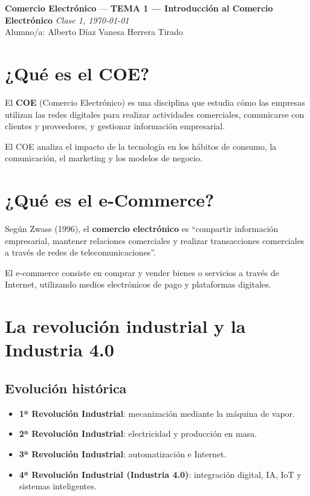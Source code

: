 \documentclass[11pt,a4paper]{article}
\newcommand{\asignatura}{Comercio Electrónico}
\newcommand{\tema}{TEMA 1 — Introducción al Comercio Electrónico}
\newcommand{\clase}{Clase 1}
\newcommand{\fecha}{\today}
\begin{document}
{\large \textbf{\asignatura} \;—\; \textbf{\tema} \hfill \textit{\clase, \fecha}}\\[0.4em]
\faUser\; Alumno/a: Alberto Díaz\hfill
\faChalkboardTeacher\; Vanesa Herrera Tirado\hfill

\vspace{0.6em}
\tableofcontents

\section{¿Qué es el COE?}
\begin{DefBox}
El \textbf{COE} (Comercio Electrónico) es una disciplina que estudia cómo las empresas utilizan las redes digitales para realizar actividades comerciales, comunicarse con clientes y proveedores, y gestionar información empresarial.
\end{DefBox}

\begin{NotaBox}
El COE analiza el impacto de la tecnología en los hábitos de consumo, la comunicación, el marketing y los modelos de negocio.
\end{NotaBox}

\section{¿Qué es el e-Commerce?}
\begin{DefBox}
Según Zwass (1996), el \textbf{comercio electrónico} es “compartir información empresarial, mantener relaciones comerciales y realizar transacciones comerciales a través de redes de telecomunicaciones”.
\end{DefBox}

\begin{ResumenBox}
El e-commerce consiste en comprar y vender bienes o servicios a través de Internet, utilizando medios electrónicos de pago y plataformas digitales.
\end{ResumenBox}

\section{La revolución industrial y la Industria 4.0}
\subsection{Evolución histórica}
\begin{itemize}
	\item \textbf{1ª Revolución Industrial}: mecanización mediante la máquina de vapor.
	\item \textbf{2ª Revolución Industrial}: electricidad y producción en masa.
	\item \textbf{3ª Revolución Industrial}: automatización e Internet.
	\item \textbf{4ª Revolución Industrial (Industria 4.0)}: integración digital, IA, IoT y sistemas inteligentes.
\end{itemize}
\end{document}
